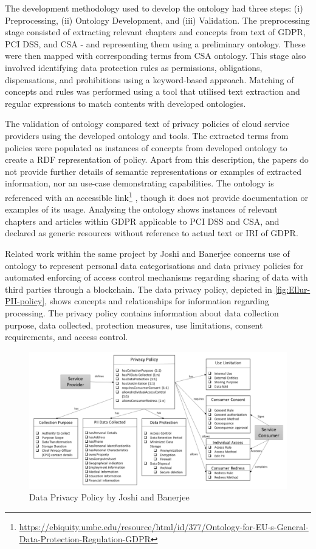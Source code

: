 The development methodology used to develop the ontology had three steps: (i) Preprocessing, (ii) Ontology Development, and (iii) Validation. The preprocessing stage consisted of extracting relevant chapters and concepts from text of GDPR, PCI DSS, and CSA - and representing them using a preliminary ontology. These were then mapped with corresponding terms from CSA ontology. This stage also involved identifying data protection rules as permissions, obligations, dispensations, and prohibitions using a keyword-based approach. Matching of concepts and rules was performed using a tool that utilised text extraction and regular expressions to match contents with developed ontologies.

The validation of ontology compared text of privacy policies of cloud
service providers using the developed ontology and tools. The
extracted terms from policies were populated as instances of concepts
from developed ontology to create a RDF representation of
policy. Apart from this description, the papers do not provide further
details of semantic representations or examples of extracted
information, nor an use-case demonstrating capabilities. The ontology
is referenced with an accessible link\footnote{\url{https://ebiquity.umbc.edu/resource/html/id/377/Ontology-for-EU-s-General-Data-Protection-Regulation-GDPR}} \cite{elluri_knowledge_2018}, though it does not provide documentation or examples of its usage. Analysing the ontology shows instances of relevant chapters and articles within GDPR applicable to PCI DSS and CSA, and declared as generic resources without reference to actual text or IRI of GDPR.

Related work within the same project by Joshi and Banerjee  \cite{joshi_automating_2019} concerns use of ontology to represent personal data categorisations and data privacy policies for automated enforcing of access control mechanisms regarding sharing of data with third parties through a blockchain. The data privacy policy, depicted in \autoref{fig:Ellur-PII-policy}, shows concepts and relationships for information regarding processing. The privacy policy contains information about data collection purpose, data collected, protection measures, use limitations, consent requirements, and access control.
\begin{figure}[htbp]
    \centering
    \includegraphics[width=\linewidth]{img/Elluri_PII_policy.png}
    \caption{Data Privacy Policy by Joshi and Banerjee \cite{joshi_automating_2019}}
    \label{fig:Ellur-PII-policy}
\end{figure}

